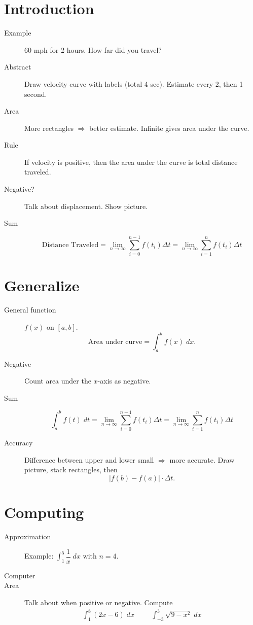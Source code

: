 \documentclass[11pt]{article}
\newcommand{\ds}{\displaystyle}
\begin{document}
\drawtitle

\section*{Introduction}
\begin{description}
\item[Example] 60 mph for 2 hours.  How far did you travel?
\item[Abstract] Draw velocity curve with labels (total 4
  sec). Estimate every 2, then 1 second.
\item[Area] More rectangles $\Rightarrow$ better estimate.  Infinite
  gives area under the curve.
\item[Rule] If velocity is positive, then the area under the curve is
  total distance traveled.
\item[Negative?] Talk about displacement.  Show picture.
\item[Sum]
  \[
  \text{Distance Traveled} = \lim_{n\to\infty}\sum_{i=0}^{n-1}f(t_i)\Delta t
  = \lim_{n\to\infty}\sum_{i=1}^{n}f(t_i)\Delta t
  \]
\end{description}

\section*{Generalize}
\begin{description}
\item[General function] $f(x)$ on $[a,b]$.
  \[
  \text{Area under curve} = \int_a^b f(x)\; dx.
  \]
\item[Negative] Count area under the $x$-axis as negative.
\item[Sum]
  \[
  \int_{a}^{b}f(t)\;dt = \lim_{n\to\infty}\sum_{i=0}^{n-1}f(t_i)\Delta t
  = \lim_{n\to\infty}\sum_{i=1}^{n}f(t_i)\Delta t
  \]
\item[Accuracy] Difference between upper and lower small $\Rightarrow$ more
  accurate.  Draw picture, stack rectangles, then
  \[
  |f(b)-f(a)|\cdot\Delta t.
  \]
\end{description}

\section*{Computing}
\begin{description}
\item[Approximation] Example: $\ds\int_{1}^{5}\dfrac{1}{x} \; dx$ with
  $n=4$.
\item[Computer]
\item[Area] Talk about when positive or negative.  Compute
  \begin{align*}
    \int_1^8 (2x-6)\; dx &&& \int_{-3}^3 \sqrt{9-x^2}\; dx
  \end{align*}
\end{description}
\end{document}
